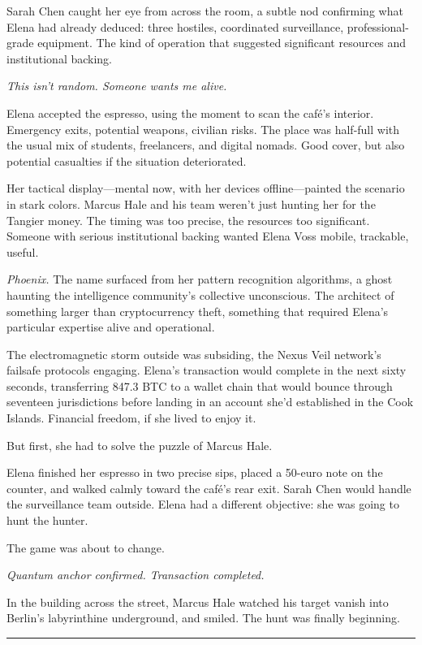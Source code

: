 \documentclass[12pt,letterpaper]{book}
\begin{document}
Sarah Chen caught her eye from across the room, a subtle nod confirming what Elena had already deduced: three hostiles, coordinated surveillance, professional-grade equipment. The kind of operation that suggested significant resources and institutional backing.

\emph{This isn't random. Someone wants me alive.}

Elena accepted the espresso, using the moment to scan the café's interior. Emergency exits, potential weapons, civilian risks. The place was half-full with the usual mix of students, freelancers, and digital nomads. Good cover, but also potential casualties if the situation deteriorated.

Her tactical display---mental now, with her devices offline---painted the scenario in stark colors. Marcus Hale and his team weren't just hunting her for the Tangier money. The timing was too precise, the resources too significant. Someone with serious institutional backing wanted Elena Voss mobile, trackable, useful.

\emph{Phoenix.} The name surfaced from her pattern recognition algorithms, a ghost haunting the intelligence community's collective unconscious. The architect of something larger than cryptocurrency theft, something that required Elena's particular expertise alive and operational.

The electromagnetic storm outside was subsiding, the Nexus Veil network's failsafe protocols engaging. Elena's transaction would complete in the next sixty seconds, transferring 847.3 BTC to a wallet chain that would bounce through seventeen jurisdictions before landing in an account she'd established in the Cook Islands. Financial freedom, if she lived to enjoy it.

But first, she had to solve the puzzle of Marcus Hale.

Elena finished her espresso in two precise sips, placed a 50-euro note on the counter, and walked calmly toward the café's rear exit. Sarah Chen would handle the surveillance team outside. Elena had a different objective: she was going to hunt the hunter.

The game was about to change.

\emph{Quantum anchor confirmed. Transaction completed.}

In the building across the street, Marcus Hale watched his target vanish into Berlin's labyrinthine underground, and smiled. The hunt was finally beginning.

\begin{center}\rule{0.5\linewidth}{0.5pt}\end{center}
\end{document}
